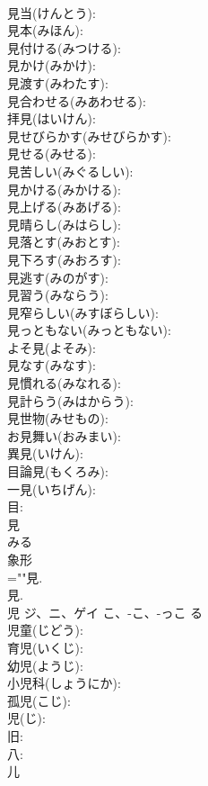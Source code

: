 \documentclass[8pt]{extreport}
\begin{document}
\begin{CJK}{UTF8}{min}
\\	見当(けんとう): 
\\	見本(みほん): 
\\	見付ける(みつける): 
\\	見かけ(みかけ): 
\\	見渡す(みわたす): 
\\	見合わせる(みあわせる): 
\\	拝見(はいけん): 
\\	見せびらかす(みせびらかす): 
\\	見せる(みせる): 
\\	見苦しい(みぐるしい): 
\\	見かける(みかける): 
\\	見上げる(みあげる): 
\\	見晴らし(みはらし): 
\\	見落とす(みおとす): 
\\	見下ろす(みおろす): 
\\	見逃す(みのがす): 
\\	見習う(みならう): 
\\	見窄らしい(みすぼらしい): 
\\	見っともない(みっともない): 
\\	よそ見(よそみ): 
\\	見なす(みなす): 
\\	見慣れる(みなれる): 
\\	見計らう(みはからう): 
\\	見世物(みせもの): 
\\	お見舞い(おみまい): 
\\	異見(いけん): 
\\	目論見(もくろみ): 
\\	一見(いちげん): 
\\	目: 
\\	見	
\\	みる	
\\	象形 
\\	=""見.
\\	見.
\\	児	ジ、ニ、ゲイ	こ、-こ、-っこ	る	
\\	児童(じどう): 
\\	育児(いくじ): 
\\	幼児(ようじ): 
\\	小児科(しょうにか): 
\\	孤児(こじ): 
\\	児(じ): 
\\	旧: 
\\	八: 
\\	儿	

\end{CJK}
\end{document}
